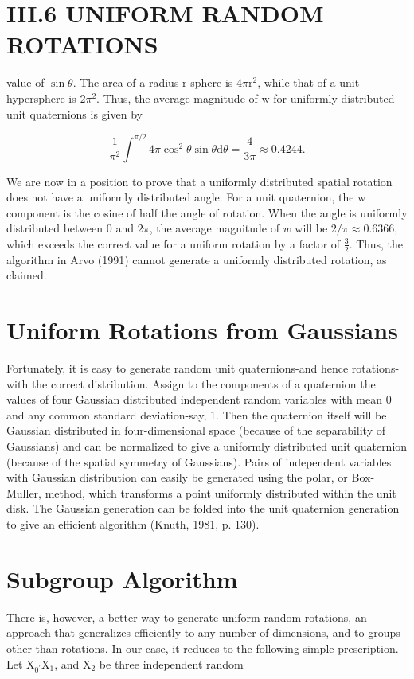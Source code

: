 \section{III.6 UNIFORM RANDOM ROTATIONS}
value of $\sin \theta$. The area of a radius $\mathrm{r}$ sphere is $4 \pi \mathrm{r}^{2}$, while that of a unit hypersphere is $2 \pi^{2}$. Thus, the average magnitude of $\mathrm{w}$ for uniformly distributed unit quaternions is given by

$$
\frac{1}{\pi^{2}} \int^{\pi / 2} 4 \pi \cos ^{2} \theta \sin \theta \mathrm{d} \theta=\frac{4}{3 \pi} \approx 0.4244 .
$$

We are now in a position to prove that a uniformly distributed spatial rotation does not have a uniformly distributed angle. For a unit quaternion, the w component is the cosine of half the angle of rotation. When the angle is uniformly distributed between 0 and $2 \pi$, the average magnitude of $w$ will be $2 / \pi \approx 0.6366$, which exceeds the correct value for a uniform rotation by a factor of $\frac{3}{2}$. Thus, the algorithm in Arvo (1991) cannot generate a uniformly distributed rotation, as claimed.

\section{Uniform Rotations from Gaussians}
Fortunately, it is easy to generate random unit quaternions-and hence rotations-with the correct distribution. Assign to the components of a quaternion the values of four Gaussian distributed independent random variables with mean 0 and any common standard deviation-say, 1. Then the quaternion itself will be Gaussian distributed in four-dimensional space (because of the separability of Gaussians) and can be normalized to give a uniformly distributed unit quaternion (because of the spatial symmetry of Gaussians). Pairs of independent variables with Gaussian distribution can easily be generated using the polar, or Box-Muller, method, which transforms a point uniformly distributed within the unit disk. The Gaussian generation can be folded into the unit quaternion generation to give an efficient algorithm (Knuth, 1981, p. 130).

\section{Subgroup Algorithm}
There is, however, a better way to generate uniform random rotations, an approach that generalizes efficiently to any number of dimensions, and to groups other than rotations. In our case, it reduces to the following simple prescription. Let $\mathrm{X}_{0^{\prime}} \mathrm{X}_{1}$, and $\mathrm{X}_{2}$ be three independent random

